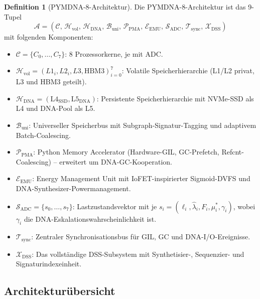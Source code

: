 ﻿\documentclass[a4paper,12pt]{article}
\theoremstyle{definition}
\newtheorem{definition}{Definition}[section]
\begin{document}
\begin{definition}[PYMDNA-8-Architektur]
  \label{def:pymdna8}
  Die PYMDNA-8-Architektur ist das 9-Tupel
  \[
    \mathcal{A} = \left(\mathcal{C},\, \mathcal{H}_{\mathrm{vol}},\,
    \mathcal{H}_{\mathrm{DNA}},\, \mathcal{B}_{\mathrm{uni}},\,
    \mathcal{P}_{\mathrm{PMA}},\, \mathcal{E}_{\mathrm{EMU}},\,
    \mathcal{S}_{\mathrm{ADC}},\, \mathcal{T}_{\mathrm{sync}},\,
    \mathcal{X}_{\mathrm{DSS}}\right)
  \]
  mit folgenden Komponenten:
  \begin{itemize}[noitemsep]
    \item $\mathcal{C} = \{C_0,\ldots,C_7\}$: 8 Prozessorkerne, je mit ADC.
    \item $\mathcal{H}_{\mathrm{vol}} = (L1_i, L2_i, L3, \mathrm{HBM3})_{i=0}^{7}$:
      Volatile Speicherhierarchie (L1/L2 privat, L3 und HBM3 geteilt).
    \item $\mathcal{H}_{\mathrm{DNA}} = (\mathrm{L4}_{\mathrm{SSD}}, \mathrm{L5}_{\mathrm{DNA}})$:
      Persistente Speicherhierarchie mit NVMe-SSD als L4 und DNA-Pool als L5.
    \item $\mathcal{B}_{\mathrm{uni}}$: Universeller Speicherbus mit
      Subgraph-Signatur-Tagging und adaptivem Batch-Coalescing.
    \item $\mathcal{P}_{\mathrm{PMA}}$: Python Memory Accelerator (Hardware-GIL,
      GC-Prefetch, Refcnt-Coalescing) -- erweitert um DNA-GC-Kooperation.
    \item $\mathcal{E}_{\mathrm{EMU}}$: Energy Management Unit mit
      IoFET-inspirierter Sigmoid-DVFS und DNA-Synthesizer-Powermanagement.
    \item $\mathcal{S}_{\mathrm{ADC}} = \{s_0,\ldots,s_7\}$: Lastzustandsvektor
      mit je $s_i = (\ell_i, \hat\lambda_i, F_i, \mu_i^*, \gamma_i)$,
      wobei $\gamma_i$ die DNA-Eskalationswahrscheinlichkeit ist.
    \item $\mathcal{T}_{\mathrm{sync}}$: Zentraler Synchronisationsbus
      für GIL, GC und DNA-I/O-Ereignisse.
    \item $\mathcal{X}_{\mathrm{DSS}}$: Das vollständige DSS-Subsystem
      mit Synthetisier-, Sequenzier- und Signaturindexeinheit.
  \end{itemize}
\end{definition}

\subsection{Architekturübersicht}
\end{document}
